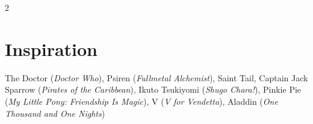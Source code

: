 \begin{multicols}{2}
\section*{Inspiration}
The Doctor (\textit{Doctor Who}), Psiren (\textit{Fullmetal Alchemist}), Saint Tail, Captain Jack Sparrow (\textit{Pirates of the Caribbean}), Ikuto Tsukiyomi (\textit{Shugo Chara!}), Pinkie Pie (\textit{My Little Pony: Friendship Is Magic}), V (\textit{V for Vendetta}), Aladdin (\textit{One Thousand and One Nights}) 

\end{multicols}
